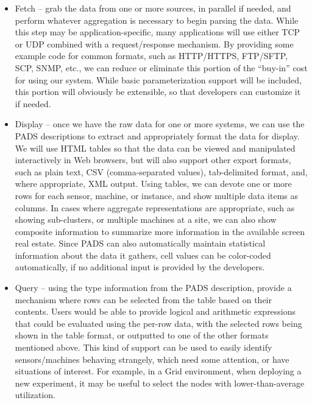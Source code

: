 \begin{itemize}

\item Fetch -- grab the data from one or more sources, in parallel if
needed, and perform whatever aggregation is necessary to begin parsing
the data. While this step may be application-specific, many
applications will use either TCP or UDP combined with a
request/response mechanism. By providing some example code for common
formats, such as HTTP/HTTPS, FTP/SFTP, SCP, SNMP, etc., we can reduce
or eliminate this portion of the ``buy-in'' cost for using our system.
While basic parameterization support will be included, this portion
will obviously be extensible, so that developers can customize it if
needed.

\item Display -- once we have the raw data for one or more systems, we
can use the PADS descriptions to extract and appropriately format the
data for display. We will use HTML tables so that the data can be
viewed and manipulated interactively in Web browsers, but will also
support other export formats, such as plain text, CSV (comma-separated
values), tab-delimited format, and, where appropriate, XML
output. Using tables, we can devote one or more rows for each sensor,
machine, or instance, and show multiple data items as columns. In
cases where aggregate representations are appropriate, such as showing
sub-clusters, or multiple machines at a site, we can also show
composite information to summarize more information in the available
screen real estate. Since PADS can also automatically maintain
statistical information about the data it gathers, cell values can be
color-coded automatically, if no additional input is provided by the
developers.

\item Query -- using the type information from the PADS description,
provide a mechanism where rows can be selected from the table based on
their contents. Users would be able to provide logical and arithmetic
expressions that could be evaluated using the per-row data, with the
selected rows being shown in the table format, or outputted to one of
the other formats mentioned above. This kind of support can be used to
easily identify sensors/machines behaving strangely, which need some
attention, or have situations of interest. For example, in a Grid
environment, when deploying a new experiment, it may be useful to
select the nodes with lower-than-average utilization.


\end{itemize}
